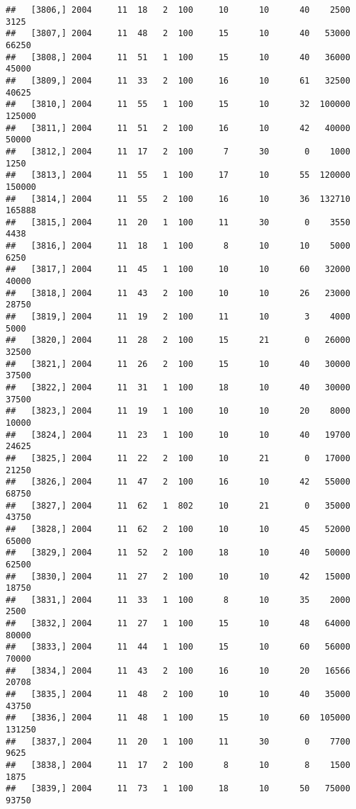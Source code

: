 \documentclass{article}\usepackage[]{graphicx}\usepackage[]{color}
\makeatletter
\newenvironment{kframe}{%
 \def\at@end@of@kframe{}%
 \ifinner\ifhmode%
  \def\at@end@of@kframe{\end{minipage}}%
  \begin{minipage}{\columnwidth}%
 \fi\fi%
 \def\FrameCommand##1{\hskip\@totalleftmargin \hskip-\fboxsep
 \colorbox{shadecolor}{##1}\hskip-\fboxsep
     \hskip-\linewidth \hskip-\@totalleftmargin \hskip\columnwidth}%
 \MakeFramed {\advance\hsize-\width
   \@totalleftmargin\z@ \linewidth\hsize
   \@setminipage}}%
 {\par\unskip\endMakeFramed%
 \at@end@of@kframe}
\newenvironment{knitrout}{}{} %
\makeatother
\begin{document}
\begin{knitrout}
\begin{kframe}
\begin{verbatim}
##   [3806,] 2004     11  18   2  100     10      10      40    2500    3125
##   [3807,] 2004     11  48   2  100     15      10      40   53000   66250
##   [3808,] 2004     11  51   1  100     15      10      40   36000   45000
##   [3809,] 2004     11  33   2  100     16      10      61   32500   40625
##   [3810,] 2004     11  55   1  100     15      10      32  100000  125000
##   [3811,] 2004     11  51   2  100     16      10      42   40000   50000
##   [3812,] 2004     11  17   2  100      7      30       0    1000    1250
##   [3813,] 2004     11  55   1  100     17      10      55  120000  150000
##   [3814,] 2004     11  55   2  100     16      10      36  132710  165888
##   [3815,] 2004     11  20   1  100     11      30       0    3550    4438
##   [3816,] 2004     11  18   1  100      8      10      10    5000    6250
##   [3817,] 2004     11  45   1  100     10      10      60   32000   40000
##   [3818,] 2004     11  43   2  100     10      10      26   23000   28750
##   [3819,] 2004     11  19   2  100     11      10       3    4000    5000
##   [3820,] 2004     11  28   2  100     15      21       0   26000   32500
##   [3821,] 2004     11  26   2  100     15      10      40   30000   37500
##   [3822,] 2004     11  31   1  100     18      10      40   30000   37500
##   [3823,] 2004     11  19   1  100     10      10      20    8000   10000
##   [3824,] 2004     11  23   1  100     10      10      40   19700   24625
##   [3825,] 2004     11  22   2  100     10      21       0   17000   21250
##   [3826,] 2004     11  47   2  100     16      10      42   55000   68750
##   [3827,] 2004     11  62   1  802     10      21       0   35000   43750
##   [3828,] 2004     11  62   2  100     10      10      45   52000   65000
##   [3829,] 2004     11  52   2  100     18      10      40   50000   62500
##   [3830,] 2004     11  27   2  100     10      10      42   15000   18750
##   [3831,] 2004     11  33   1  100      8      10      35    2000    2500
##   [3832,] 2004     11  27   1  100     15      10      48   64000   80000
##   [3833,] 2004     11  44   1  100     15      10      60   56000   70000
##   [3834,] 2004     11  43   2  100     16      10      20   16566   20708
##   [3835,] 2004     11  48   2  100     10      10      40   35000   43750
##   [3836,] 2004     11  48   1  100     15      10      60  105000  131250
##   [3837,] 2004     11  20   1  100     11      30       0    7700    9625
##   [3838,] 2004     11  17   2  100      8      10       8    1500    1875
##   [3839,] 2004     11  73   1  100     18      10      50   75000   93750

\end{verbatim}
\end{kframe}
\end{knitrout}
\end{document}
